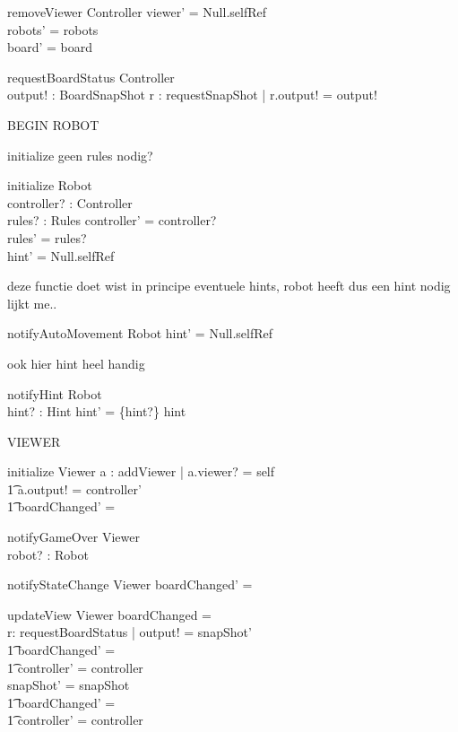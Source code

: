 \documentclass[a4paper,11pt]{article}
\begin{document}
\begin{schema}{removeViewer}
\Delta Controller 
\where
viewer' = Null.selfRef \\
robots' = robots \\
board' = board
\end{schema}

\begin{schema}{requestBoardStatus}
\Xi Controller \\
output! : BoardSnapShot
\where
\exists r : requestSnapShot | r.output! = output!
\end{schema}


BEGIN ROBOT

initialize geen rules nodig?
\begin{schema}{initialize}
\Delta Robot \\
controller? : Controller \\
rules? : Rules
\where
controller' = controller? \\
rules' = rules? \\
hint' = Null.selfRef
\end{schema}

deze functie doet wist in principe eventuele hints, robot heeft dus een hint nodig lijkt me..
\begin{schema}{notifyAutoMovement}
\Delta Robot
\where
hint' = Null.selfRef
\end{schema}

ook hier hint heel handig
\begin{schema}{notifyHint}
\Delta Robot \\
hint? : Hint
\where
hint' = \{hint?\} \union hint
\end{schema}

VIEWER

\begin{schema}{initialize}
\Delta Viewer
\where
\exists a : addViewer | a.viewer? = self \implies \\ \t1
a.output! = controller' \\ \t1
boardChanged' = \false
\end{schema}

\begin{schema}{notifyGameOver}
\Delta Viewer \\
robot? : Robot
\where
\end{schema}

\begin{schema}{notifyStateChange}
\Delta Viewer 
\where
boardChanged' = \true
\end{schema}

\begin{schema}{updateView}
\Delta Viewer
\where
\IF boardChanged = \true \\
\THEN \exists r: requestBoardStatus | output! = snapShot' \\ \t1
boardChanged' = \false \\ \t1
controller' = controller \\ 
\ELSE snapShot' = snapShot \\ \t1
boardChanged' = \false \\ \t1
controller' = controller
\end{schema}
\end{document}
